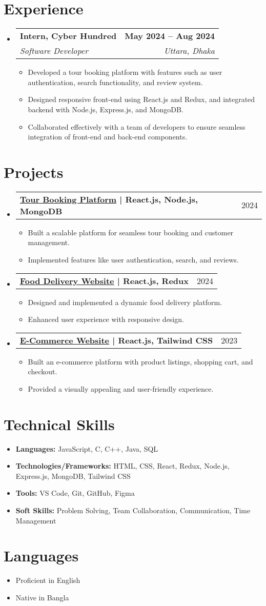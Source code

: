 \documentclass[letterpaper,11pt]{article}
\makeatletter
\newcommand{\resumeSubheading}[4]{
  \vspace{-2pt}\item
  \begin{tabular*}{\textwidth}{l@{\extracolsep{\fill}}r}
    \textbf{#1} & \textbf{#2} \\
    \textit{#3} & \textit{#4} \\
  \end{tabular*}\vspace{-5pt}
}
\newcommand{\resumeProjectHeading}[2]{
  \item
  \begin{tabular*}{\textwidth}{l@{\extracolsep{\fill}}r}
    \textbf{#1} & #2 \\
  \end{tabular*}\vspace{-5pt}
}
\newcommand{\resumeItem}[1]{\item \small{#1\vspace{-2pt}}}
\newcommand{\resumeSubHeadingListStart}{\begin{itemize}[leftmargin=0in, label={}]}
\newcommand{\resumeSubHeadingListEnd}{\end{itemize}}
\newcommand{\resumeItemListStart}{\begin{itemize}[label={-}]}
\newcommand{\resumeItemListEnd}{\end{itemize}}
\makeatother
\begin{document}
\section{Experience}
  \resumeSubHeadingListStart
    \resumeSubheading
      {Intern, Cyber Hundred}{May 2024 -- Aug 2024}
      {Software Developer}{Uttara, Dhaka}
      \resumeItemListStart
        \resumeItem{Developed a tour booking platform with features such as user authentication, search functionality, and review system.}
        \resumeItem{Designed responsive front-end using React.js and Redux, and integrated backend with Node.js, Express.js, and MongoDB.}
        \resumeItem{Collaborated effectively with a team of developers to ensure seamless integration of front-end and back-end components.}
      \resumeItemListEnd
  \resumeSubHeadingListEnd

\section{Projects}
  \resumeSubHeadingListStart
    \resumeProjectHeading
      {\href{#}{Tour Booking Platform} | React.js, Node.js, MongoDB}{2024}
      \resumeItemListStart
        \resumeItem{Built a scalable platform for seamless tour booking and customer management.}
        \resumeItem{Implemented features like user authentication, search, and reviews.}
      \resumeItemListEnd
    \resumeProjectHeading
      {\href{https://github.com/md-shafiuddin-shajib/Food-Delivery.git}{Food Delivery Website} | React.js, Redux}{2024}
      \resumeItemListStart
                \resumeItem{Designed and implemented a dynamic food delivery platform.}
        \resumeItem{Enhanced user experience with responsive design.}
      \resumeItemListEnd
    \resumeProjectHeading
      {\href{https://github.com/md-shafiuddin-shajib/Ecommer-react.git}{E-Commerce Website} | React.js, Tailwind CSS}{2023}
      \resumeItemListStart
               \resumeItem{Built an e-commerce platform with product listings, shopping cart, and checkout.}
        \resumeItem{Provided a visually appealing and user-friendly experience.}
      \resumeItemListEnd
  \resumeSubHeadingListEnd

\section{Technical Skills}
\small{
\begin{itemize}[leftmargin=0.15in, label={}]
  \item \textbf{Languages:} JavaScript, C, C++, Java, SQL
  \item \textbf{Technologies/Frameworks:} HTML, CSS, React, Redux, Node.js, Express.js, MongoDB, Tailwind CSS
  \item \textbf{Tools:} VS Code, Git, GitHub, Figma
  \item \textbf{Soft Skills:} Problem Solving, Team Collaboration, Communication, Time Management
\end{itemize}
}

\section{Languages}
\begin{itemize}[itemsep=0pt]
    \item Proficient in English
    \item Native in Bangla
\end{itemize}
\end{document}
